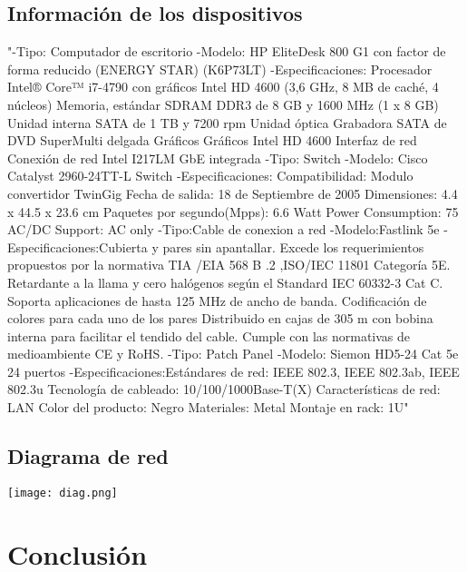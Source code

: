 \documentclass{udpreport}
\begin{document}
\section{Información de los dispositivos}
"-Tipo: Computador de escritorio
-Modelo:  HP EliteDesk 800 G1 con factor de forma reducido (ENERGY STAR)
(K6P73LT)
-Especificaciones: Procesador
Intel® Core™ i7-4790 con gráficos Intel HD 4600 (3,6 GHz, 8 MB de caché, 4 núcleos)
Memoria, estándar
SDRAM DDR3 de 8 GB y 1600 MHz (1 x 8 GB)
Unidad interna
SATA de 1 TB y 7200 rpm
Unidad óptica
Grabadora SATA de DVD SuperMulti delgada
Gráficos
Gráficos Intel HD 4600
Interfaz de red
Conexión de red Intel I217LM GbE integrada
-Tipo: Switch
-Modelo: Cisco Catalyst 2960-24TT-L Switch
-Especificaciones:
Compatibilidad:
Modulo convertidor TwinGig
Fecha de salida:
18 de Septiembre de 2005
Dimensiones:
4.4 x 44.5 x 23.6 cm
Paquetes por segundo(Mpps):
6.6
Watt Power Consumption:	
75
AC/DC Support:	
AC only
-Tipo:Cable de conexion a red
-Modelo:Fastlink 5e
-Especificaciones:Cubierta y pares sin apantallar.
Excede los requerimientos propuestos por la normativa TIA /EIA 568 B .2 ,ISO/IEC 11801 Categoría 5E.
Retardante a la llama y cero halógenos según el Standard IEC 60332-3 Cat C.
Soporta aplicaciones de hasta 125 MHz de ancho de banda.
Codificación de colores para cada uno de los pares
Distribuido en cajas de 305 m con bobina interna para facilitar el tendido del cable.
Cumple con las normativas de medioambiente CE y RoHS.
-Tipo: Patch Panel
-Modelo: Siemon HD5-24 Cat 5e 24 puertos
-Especificaciones:Estándares de red: IEEE 802.3, IEEE 802.3ab, IEEE 802.3u
Tecnología de cableado: 10/100/1000Base-T(X)
Características de red: LAN
Color del producto: Negro
Materiales: Metal
Montaje en rack: 1U"
\section{Diagrama de red}
\texttt{[image: diag.png]}
\chapter{Conclusión}
\end{document}
